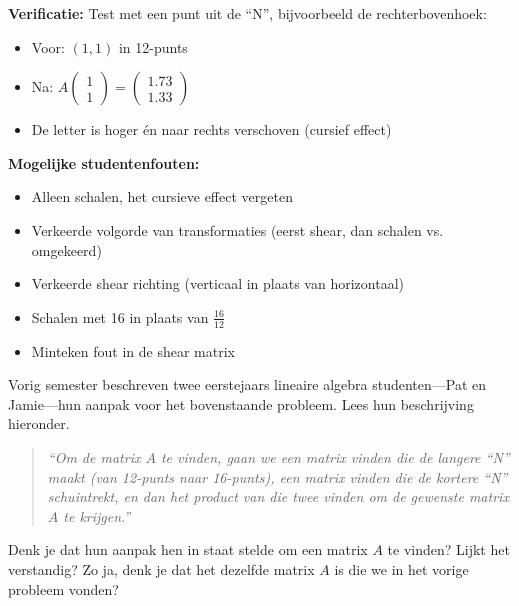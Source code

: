 \documentclass{ximera}
\begin{document}
\begin{freeResponse}
\textbf{Verificatie:}
Test met een punt uit de ``N'', bijvoorbeeld de rechterbovenhoek:
\begin{itemize}
\item Voor: $(1, 1)$ in 12-punts
\item Na: $A \begin{pmatrix} 1 \\ 1 \end{pmatrix} = \begin{pmatrix} 1.73 \\ 1.33 \end{pmatrix}$
\item De letter is hoger én naar rechts verschoven (cursief effect)
\end{itemize}

\textbf{Mogelijke studentenfouten:}
\begin{itemize}
\item Alleen schalen, het cursieve effect vergeten
\item Verkeerde volgorde van transformaties (eerst shear, dan schalen vs. omgekeerd)
\item Verkeerde shear richting (verticaal in plaats van horizontaal)
\item Schalen met 16 in plaats van $\frac{16}{12}$
\item Minteken fout in de shear matrix
\end{itemize}
\end{freeResponse}

\begin{problem}
Vorig semester beschreven twee eerstejaars lineaire algebra studenten---Pat en Jamie---hun aanpak voor het bovenstaande probleem. Lees hun beschrijving hieronder.

\begin{quote}
\textit{``Om de matrix $A$ te vinden, gaan we een matrix vinden die de langere ``N'' maakt (van 12-punts naar 16-punts), een matrix vinden die de kortere ``N'' schuintrekt, en dan het product van die twee vinden om de gewenste matrix $A$ te krijgen.''}
\end{quote}

Denk je dat hun aanpak hen in staat stelde om een matrix $A$ te vinden? Lijkt het verstandig? Zo ja, denk je dat het dezelfde matrix $A$ is die we in het vorige probleem vonden?
\end{problem}
\end{document}
